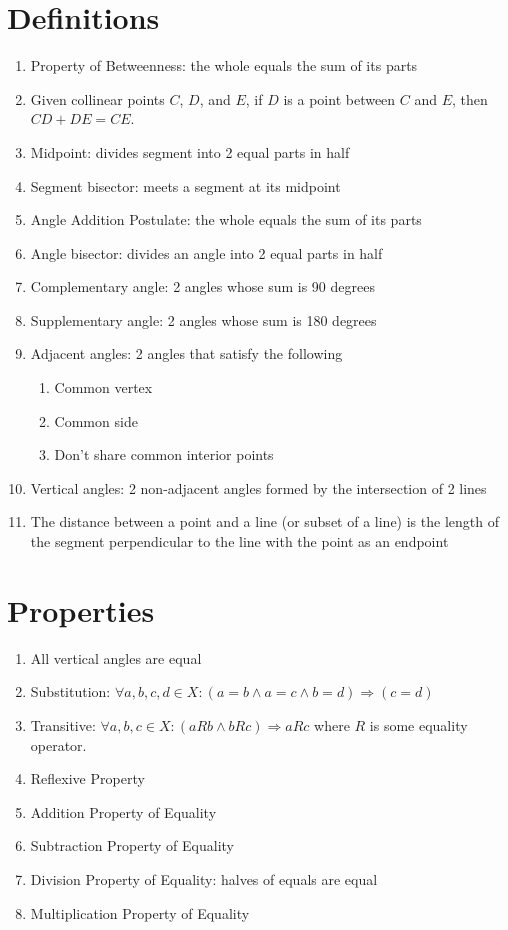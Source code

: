 \section*{Definitions}
\begin{enumerate}
    \item Property of Betweenness: the whole equals the sum of its parts
    \item Given collinear points $C$, $D$, and $E$, if $D$ is a point between $C$ and $E$, then $CD + DE = CE$.
    \item Midpoint: divides segment into 2 equal parts in half
    \item Segment bisector: meets a segment at its midpoint
    \item Angle Addition Postulate: the whole equals the sum of its parts
    \item Angle bisector: divides an angle into 2 equal parts in half
    \item Complementary angle: 2 angles whose sum is 90 degrees
    \item Supplementary angle: 2 angles whose sum is 180 degrees
    \item Adjacent angles: 2 angles that satisfy the following
    \begin{enumerate}
        \item Common vertex
        \item Common side
        \item Don’t share common interior points
    \end{enumerate}
    \item Vertical angles: 2 non-adjacent angles formed by the intersection of 2 lines
    \item The distance between a point and a line (or subset of a line) is the length of the segment perpendicular to the line with the point as an endpoint
\end{enumerate}

\section*{Properties}
\begin{enumerate}
    \item All vertical angles are equal
    \item Substitution: $\forall a,b,c,d\in X:(a=b\wedge a=c\wedge b=d)\Rightarrow (c=d)$
    \item Transitive: $\forall a,b,c\in X:(aRb\wedge bRc)\Rightarrow aRc$ where $R$ is some equality operator.
    \item Reflexive Property
    \item Addition Property of Equality
    \item Subtraction Property of Equality
    \item Division Property of Equality: halves of equals are equal
    \item Multiplication Property of Equality
\end{enumerate}

